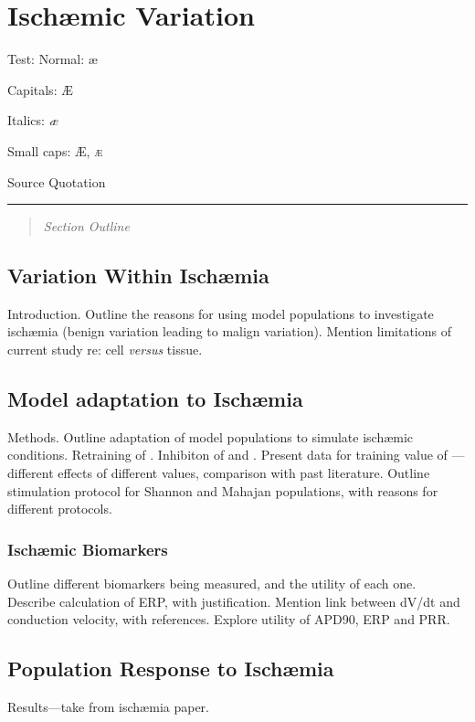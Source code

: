 \documentclass[../thesis-main.tex]{subfiles}
\begin{document}
\chapter{Isch\ae{}mic Variation}
\label{ch:ischaemia}

Test: Normal: \ae{}

Capitals: \AE{}

Italics: \emph{\ae{}}

Small caps: \textsc{\AE{}, \ae{}}

\begin{aquote}{Source}
  {\selectfont
   Quotation
  }
\end{aquote}
\rule{\linewidth}{0.25mm}

 \begin{quote}
  \emph{Section Outline}
 \end{quote}
 
 \section{Variation Within Isch\ae{}mia}
 \label{sec:ischaemia-rationale}
 Introduction. Outline the reasons for using model populations to investigate isch\ae{}mia (benign variation leading to malign variation). Mention limitations of current study re: cell \emph{versus} tissue.
 
 \section{Model adaptation to Isch\ae{}mia}
 \label{sec:ischaemia-methods}
 Methods. Outline adaptation of model populations to simulate isch\ae{}mic conditions. Retraining of \istim{}. Inhibiton of \ina{} and \ica{}. Present data for training value of \gkatp{}---different effects of different values, comparison with past literature. Outline stimulation protocol for Shannon and Mahajan populations, with reasons for different protocols.
 
 \subsection{Isch\ae{}mic Biomarkers}
 \label{subsec:isch-biomarkers}
 Outline different biomarkers being measured, and the utility of each one. Describe calculation of ERP, with justification. Mention link between dV/dt and conduction velocity, with references. Explore utility of APD90, ERP and PRR.
 
 \section{Population Response to Isch\ae{}mia}
 \label{sec:isch-population}
 Results---take from isch\ae{}mia paper.
 
\end{document}
